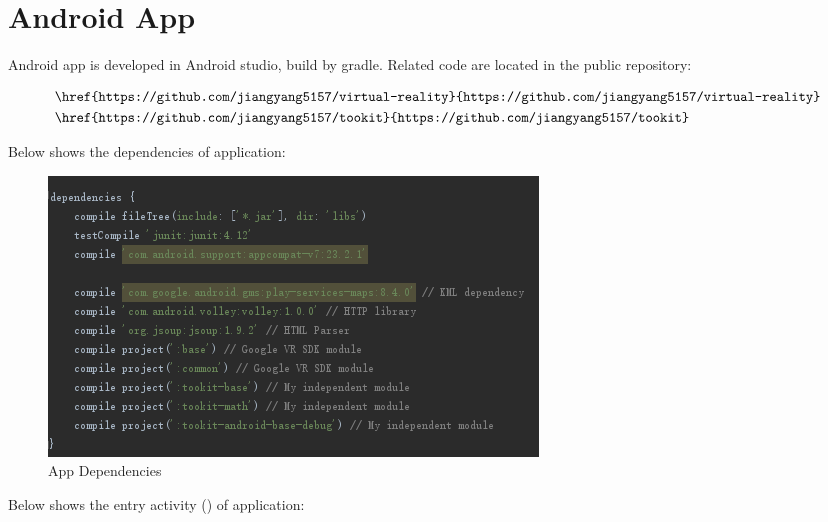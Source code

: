 \label{appendix-android-app}
\chapter{Android App}

Android app is developed in Android studio, build by gradle. Related code are located in the public repository:

\[
\begin{array}{lr}
\begin{aligned}
&\code{\href{https://github.com/jiangyang5157/virtual-reality}{https://github.com/jiangyang5157/virtual-reality}}\\
&\code{\href{https://github.com/jiangyang5157/tookit}{https://github.com/jiangyang5157/tookit}}\\
\end{aligned}
\end{array}
\]

Below shows the dependencies of application:

\begin{figure}[H]
\caption{App Dependencies}
\label{fig:app-dependencies}
\centering
\includegraphics[]{Figures/app-dependencies.png}
\decoRule
\end{figure}

Below shows the entry activity () of application:

